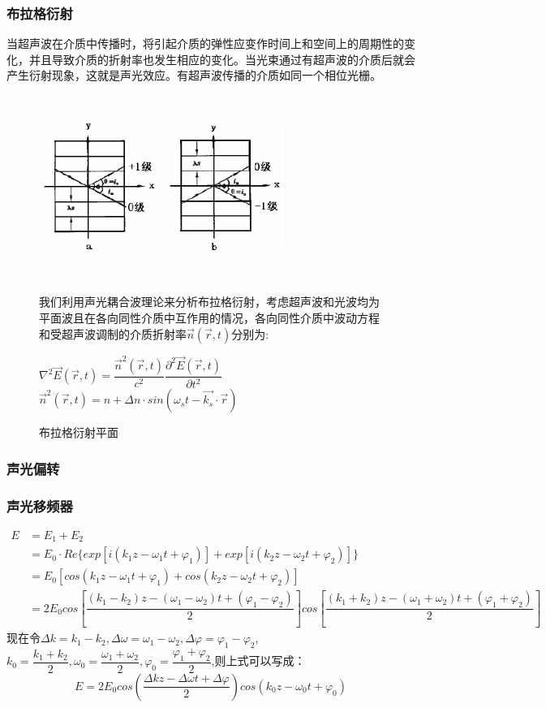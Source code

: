 \documentclass[UTF8,a4paper,12pt]{article}
\begin{document}
\subsubsection{布拉格衍射}
当超声波在介质中传播时，将引起介质的弹性应变作时间上和空间上的周期性的变化，并且导致介质的折射率也发生相应的变化。当光束通过有超声波的介质后就会产生衍射现象，这就是声光效应。有超声波传播的介质如同一个相位光栅。
\begin{figure}[htbp] 
 \begin{center} \includegraphics[width=8cm,height=6cm]{bragyspm} 
 \caption{\label{fig:bragyspm}布拉格衍射平面}
\end{center}
我们利用声光耦合波理论来分析布拉格衍射，考虑超声波和光波均为平面波且在各向同性介质中互作用的情况，各向同性介质中波动方程和受超声波调制的介质折射率$\vec{n}(\vec{r},t)$分别为:

\centering $\nabla^2\vec{E}(\vec{r},t) = \dfrac{{\vec{n}}^2(\vec{r},t)}{c^2}\dfrac{\partial^2\vec{E}(\vec{r},t)}{\partial t^2}$\\
 \centering $\vec{n}^2(\vec{r},t) = n+\Delta n\cdot sin(\omega_s t-\vec{k_s}\cdot \vec{r})$


\end{figure}
\subsubsection{声光偏转}
\subsubsection{声光移频器}
\begin{equation*}
\begin{split}
E &= E_1+E_2  \\
&= E_0\cdot Re\{exp[i(k_1z-\omega_1t+\varphi_1)]+exp[i(k_2z-\omega_2t+\varphi_2)]\} \\
&= E_0[cos(k_1z-\omega_1t+\varphi_1)+cos(k_2z-\omega_2t+\varphi_2)]\\
&= 2E_0cos[\dfrac{(k_1-k_2)z-(\omega_1-\omega_2)t+(\varphi_1-\varphi_2)}{2}]cos[\dfrac{(k_1+k_2)z-(\omega_1+\omega_2)t+(\varphi_1+\varphi_2)}{2}]
\end{split}
\end{equation*}
现在令$\Delta k=k_1-k_2,\Delta \omega=\omega_1-\omega_2,\Delta \varphi=\varphi_1-\varphi_2$,$k_0=\dfrac{k_1+k_2}{2},\omega_0=\dfrac{\omega_1+\omega_2}{2},\varphi_0=\dfrac{\varphi_1+\varphi_2}{2}$,则上式可以写成：
\begin{equation*}
E = 2E_0cos(\dfrac{\Delta k z-\Delta{\omega} t+\Delta \varphi}{2})cos(k_0 z-\omega_0 t+\varphi_0)
\end{equation*}
\end{document}
